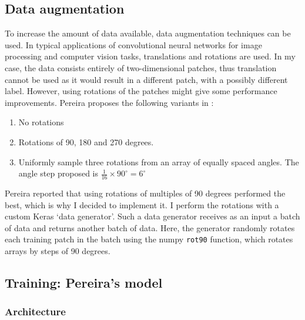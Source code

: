 \documentclass[12pt,a4paper,twoside,openright]{report}
\begin{document}
\subsection{Data augmentation}
To increase the amount of data available, data augmentation techniques can be used. In typical applications of convolutional neural networks for image processing and computer vision tasks, translations and rotations are used. In my case, the data consists entirely of two-dimensional patches, thus translation cannot be used as it would result in a different patch, with a possibly different label. However, using rotations of the patches might give some performance improvements. Pereira proposes the following variants in \cite{pereira}:
\begin{enumerate}
	\item No rotations
	\item Rotations of 90, 180 and 270 degrees.
	\item Uniformly sample three rotations from an array of equally spaced angles. The angle step proposed is $\frac{1}{16} \times 90^{\circ} = 6^{\circ}$
\end{enumerate}
Pereira reported that using rotations of multiples of 90 degrees performed the best, which is why I decided to implement it. I perform the rotations with a custom Keras `data generator'. Such a data generator receives as an input a batch of data and returns another batch of data. Here, the generator randomly rotates each training patch in the batch using the numpy \texttt{rot90} function, which rotates arrays by steps of 90 degrees.

\subsection{Training: Pereira's model}

\subsubsection{Architecture}
\end{document}
